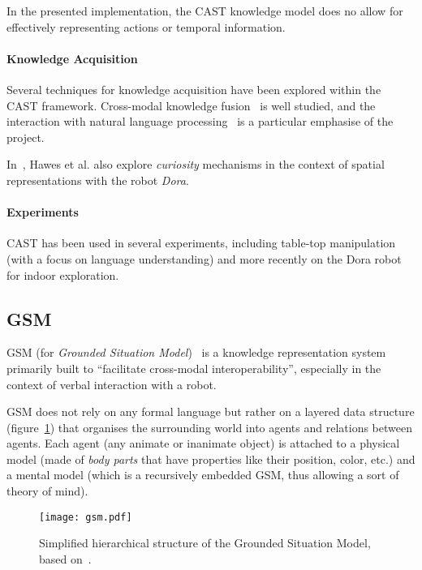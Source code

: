 \documentclass{IEEEtran}
\begin{document}
In the presented implementation, the CAST knowledge model does no allow for
effectively representing actions or temporal information.

\paragraph{Knowledge Acquisition} Several techniques for knowledge acquisition
have been explored within the CAST framework. Cross-modal knowledge
fusion~\cite{Hawes2007a} is well studied, and the interaction with natural
language processing~\cite{Kruijff2010, Kruijff2010a} is a particular emphasise
of the project.

In~\cite{Hawes2011}, Hawes et al. also explore \emph{curiosity} mechanisms in
the context of spatial representations with the robot \emph{Dora}.

\paragraph{Experiments} CAST has been used in several experiments, including
table-top manipulation (with a focus on language understanding) and more
recently on the Dora robot~\cite{Hawes2011} for indoor exploration.

\subsection{GSM}
\label{sect|gsm}

GSM (for \emph{Grounded Situation Model})~\cite{Mavridis2006} is a knowledge
representation system primarily built to ``facilitate cross-modal
interoperability'',  especially in the context of verbal interaction with a
robot.

GSM does not rely on any formal language but rather on a layered data structure
(figure~\ref{fig|gsm}) that organises the surrounding world into agents and
relations between agents.  Each agent (any animate or inanimate object) is
attached to a physical model (made of \emph{body parts} that have properties
like their position, color, etc.) and a mental model (which is a recursively
embedded GSM, thus allowing a sort of theory of mind).

\begin{figure}
    \centering
    \texttt{[image: gsm.pdf]}

    \caption{Simplified hierarchical structure of the Grounded Situation Model,
    based on~\cite{Mavridis2006}.}

    \label{fig|gsm}
\end{figure}
\end{document}
